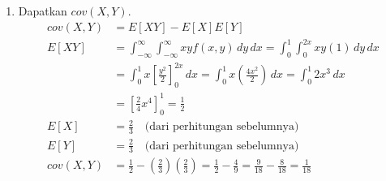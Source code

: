\documentclass[11pt,letterpaper]{article}
\begin{document}
\begin{enumerate}
\begin{enumerate}[label=\alph*)]
\begin{align*}
                \end{align*}
                Cara alternatif (langsung):
                \begin{align*}
                  E[Y \mid x]      & = \int_{0}^{2x} y f(y \mid x) \,dy = \int_{0}^{2x} y \frac{1}{2x} \,dy = \frac{1}{2x} \left[ \frac{y^2}{2} \right]_{0}^{2x} = \frac{1}{2x} \left( \frac{4x^2}{2} \right) = x \\
                  E_X[E[Y \mid X]] & = E_X[X] = \int_{0}^{1} x f_1(x) \,dx = \int_{0}^{1} x(2x) \,dx = \int_{0}^{1} 2x^2 \,dx = \left[ \frac{2}{3}x^3 \right]_{0}^{1} = \frac{2}{3}
                \end{align*}
          \item Dapatkan $cov(X,Y)$.
                \begin{align*}
                  cov(X,Y) & = E[XY] - E[X]E[Y]                                                                                                                        \\
                  E[XY]    & = \int_{-\infty}^{\infty} \int_{-\infty}^{\infty} xy f(x,y) \,dy \,dx = \int_{0}^{1} \int_{0}^{2x} xy (1) \,dy \,dx                       \\
                           & = \int_{0}^{1} x \left[ \frac{y^2}{2} \right]_{0}^{2x} \,dx = \int_{0}^{1} x \left( \frac{4x^2}{2} \right) \,dx = \int_{0}^{1} 2x^3 \,dx  \\
                           & = \left[ \frac{2}{4}x^4 \right]_{0}^{1} = \frac{1}{2}                                                                                     \\
                  E[X]     & = \frac{2}{3} \quad \text{(dari perhitungan sebelumnya)}                                                                                  \\
                  E[Y]     & = \frac{2}{3} \quad \text{(dari perhitungan sebelumnya)}                                                                                  \\
                  cov(X,Y) & = \frac{1}{2} - \left(\frac{2}{3}\right)\left(\frac{2}{3}\right) = \frac{1}{2} - \frac{4}{9} = \frac{9}{18} - \frac{8}{18} = \frac{1}{18}
                \end{align*}
        \end{enumerate}


\end{enumerate}
\end{document}
